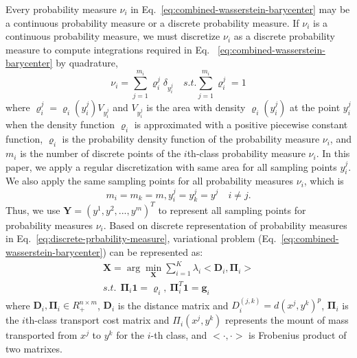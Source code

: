 Every probability measure $\nu_i$ in Eq.~\ref{eq:combined-wasserstein-barycenter} may be a continuous probability measure or a discrete probability measure.
If $\nu_i$ is a continuous probability measure,
we must discretize  $\nu_i$ as a discrete probability measure
to compute integrations required in Eq. ~\ref{eq:combined-wasserstein-barycenter} by quadrature,
\begin{equation}\label{eq:discrete-prbability-measure}
\nu_i=\sum\limits_{j=1}^{m_i}\varrho_i^j\delta_{y_i^j} \quad s.t. \sum\limits_{j=1}^{m_i}\varrho_i^j=1
\end{equation}
where $\varrho_i^j=\varrho_i(y_i^j)V_{y_i^j}$
and $V_{y_i^j}$ is the area with density $\varrho_i(y_i^j)$ at the point $y_i^j$ when the density function
$\varrho_i$ is approximated with a positive piecewise constant function,
$\varrho_i$ is the probability density function of the probability measure $\nu_i$,
and $m_i$ is the number of discrete points of the $i$th-class probability measure $\nu_i$.
In this paper,
we apply a regular discretization with same area for all sampling points $y_i^j$.
We also apply the same sampling points for all probability measures $\nu_i$,
which is
\begin{equation*}
m_i=m_k=m, y_i^j=y_k^j=y^j \quad{i\neq j}.
\end{equation*}
Thus, we use $\mathbf{Y}=(y^1,y^2,...,y^m)^T$ to represent all sampling points for probability measures $\nu_i$.
Based on discrete representation of probability measures in Eq.~\ref{eq:discrete-prbability-measure},
variational problem (Eq.~\ref{eq:combined-wasserstein-barycenter}) can be represented as:
\begin{equation}\label{eq:discrete-multi-problem}
  \begin{aligned}
  \mathbf{X}=\arg\min\limits_{\mathbf{X}}\sum\limits_{i=1}^K\lambda_i<\mathbf{D}_i,\mathbf{\Pi}_i> \\
    s.t.\ \ \mathbf{\Pi}_i\mathbf{1}=\mathbf{\varrho}_i,\ \mathbf{\Pi}_i^T\mathbf{1}=\mathbf{g}_i
  \end{aligned}
\end{equation}
where
 $\mathbf{D}_i,\mathbf{\Pi}_i\in R_+^{n\times m}$,
 $\mathbf{D}_i$ is the distance matrix and $D_i^{(j,k)}=d(x^j,y^k)^p$,
 $\mathbf{\Pi}_i$ is the $i$th-class transport cost matrix and $\Pi_i(x^j,y^k)$ represents the mount of mass transported from $x^j$ to $y^k$ for the $i$-th class,
 and $<\cdot,\cdot>$ is Frobenius product of two matrixes.

